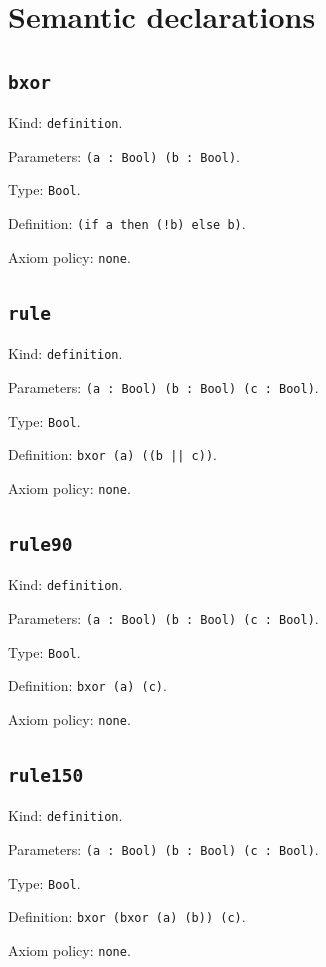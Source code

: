 \documentclass[11pt]{article}
\begin{document}
\section*{Semantic declarations}
\subsection*{\texttt{bxor}}
\noindent Kind: \texttt{definition}.\par
\noindent Parameters: \texttt{(a : Bool) (b : Bool)}.\par
\noindent Type: \texttt{Bool}.\par
\noindent Definition: \texttt{(if a then (!b) else b)}.\par
\noindent Axiom policy: \texttt{none}.\par
\subsection*{\texttt{rule}}
\noindent Kind: \texttt{definition}.\par
\noindent Parameters: \texttt{(a : Bool) (b : Bool) (c : Bool)}.\par
\noindent Type: \texttt{Bool}.\par
\noindent Definition: \texttt{bxor (a) ((b || c))}.\par
\noindent Axiom policy: \texttt{none}.\par
\subsection*{\texttt{rule90}}
\noindent Kind: \texttt{definition}.\par
\noindent Parameters: \texttt{(a : Bool) (b : Bool) (c : Bool)}.\par
\noindent Type: \texttt{Bool}.\par
\noindent Definition: \texttt{bxor (a) (c)}.\par
\noindent Axiom policy: \texttt{none}.\par
\subsection*{\texttt{rule150}}
\noindent Kind: \texttt{definition}.\par
\noindent Parameters: \texttt{(a : Bool) (b : Bool) (c : Bool)}.\par
\noindent Type: \texttt{Bool}.\par
\noindent Definition: \texttt{bxor (bxor (a) (b)) (c)}.\par
\noindent Axiom policy: \texttt{none}.\par
\end{document}
